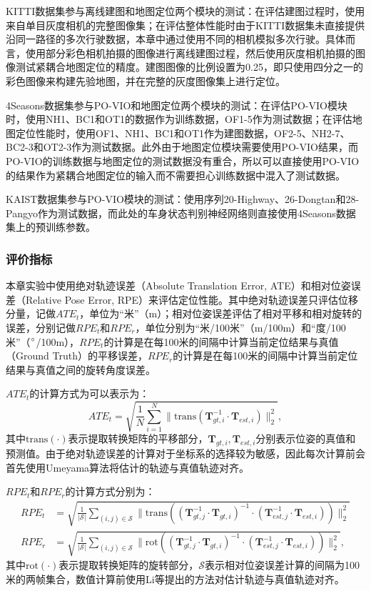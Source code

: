 KITTI数据集参与离线建图和地图定位两个模块的测试：在评估建图过程时，使用来自单目灰度相机的完整图像集；在评估整体性能时由于KITTI数据集未直接提供沿同一路径的多次行驶数据，本章中通过使用不同的相机模拟多次行驶。具体而言，使用部分彩色相机拍摄的图像进行离线建图过程，然后使用灰度相机拍摄的图像测试紧耦合地图定位的精度。建图图像的比例设置为0.25，即只使用四分之一的彩色图像来构建先验地图，并在完整的灰度图像集上进行定位。

4Seasons数据集参与PO-VIO和地图定位两个模块的测试：在评估PO-VIO模块时，使用NH1、BC1和OT1的数据作为训练数据，OF1-5作为测试数据；在评估地图定位性能时，使用OF1、NH1、BC1和OT1作为建图数据，OF2-5、NH2-7、BC2-3和OT2-3作为测试数据。此外由于地图定位模块需要使用PO-VIO结果，而PO-VIO的训练数据与地图定位的测试数据没有重合，所以可以直接使用PO-VIO的结果作为紧耦合地图定位的输入而不需要担心训练数据中混入了测试数据。

KAIST数据集参与PO-VIO模块的测试：使用序列20-Highway、26-Dongtan和28-Pangyo作为测试数据，而此处的车身状态判别神经网络则直接使用4Seasons数据集上的预训练参数。

\subsubsection{评价指标}

本章实验中使用绝对轨迹误差（Absolute Translation Error, ATE）\cite{sturm2012benchmark}和相对位姿误差（Relative Pose Error, RPE）\cite{geiger2012we}来评估定位性能。其中绝对轨迹误差只评估位移分量，记做$ATE_t$，单位为“米”（m）；相对位姿误差评估了相对平移和相对旋转的误差，分别记做$RPE_{t}$和$RPE_{r}$，单位分别为“米/100米”（m/100m）和“度/100米”（$\degree$/100m），$RPE_{t}$的计算是在每100米的间隔中计算当前定位结果与真值（Ground Truth）的平移误差，$RPE_{r}$的计算是在每100米的间隔中计算当前定位结果与真值之间的旋转角度误差。

$ATE_t$的计算方式为可以表示为：
\begin{equation}
  ATE_t = \sqrt{\frac{1}{N}\sum_{i=1}^{N}\|\text{trans}(\symbf{T}_{gt,i}^{-1}\cdot \symbf{T}_{est,i})\|^{2}_{2}},
\end{equation}
其中$\text{trans}(\cdot)$表示提取转换矩阵的平移部分，$\symbf{T}_{gt,i}, \symbf{T}_{est,i}$分别表示位姿的真值和预测值。由于绝对轨迹误差的计算对于坐标系的选择较为敏感，因此每次计算前会首先使用Umeyama算法\cite{arun1987least}将估计的轨迹与真值轨迹对齐。

$RPE_{t}$和$RPE_{r}$的计算方式分别为：
\begin{align}
  RPE_{t} &= \sqrt{\frac{1}{|\mathcal{S}|}\sum_{(i,j) \in \mathcal{S}}\| \text{trans}\left ((\symbf{T}_{gt,j}^{-1} \cdot \symbf{T}_{gt,i})^{-1}\cdot (\symbf{T}_{est,j}^{-1} \cdot \symbf{T}_{est,i}) \right ) \|_2^2} \\
  RPE_{r} &= \sqrt{\frac{1}{|\mathcal{S}|}\sum_{(i,j) \in \mathcal{S}}\| \text{rot}\left ((\symbf{T}_{gt,j}^{-1} \cdot \symbf{T}_{gt,i})^{-1}\cdot (\symbf{T}_{est,j}^{-1} \cdot \symbf{T}_{est,i}) \right ) \|_2^2},
\end{align}
其中$\text{rot}(\cdot)$表示提取转换矩阵的旋转部分，$\mathcal{S}$表示相对位姿误差计算的间隔为100米的两帧集合，数值计算前使用Li等\cite{li2023textslam}提出的方法对估计轨迹与真值轨迹对齐。


